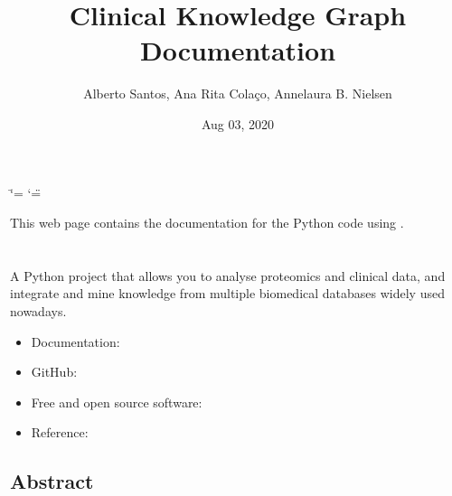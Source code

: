 \documentclass[letterpaper,10pt,english]{sphinxmanual}
\title{Clinical Knowledge Graph Documentation}
\date{Aug 03, 2020}
\author{Alberto Santos, Ana Rita Colaço, Annelaura B. Nielsen}
\begin{document}
\ifdefined\shorthandoff
  \ifnum\catcode`\=\string=\active\shorthandoff{=}\fi
  \ifnum\catcode`\"=\active{}\fi
\fi

\pagestyle{empty}
\sphinxmaketitle
\pagestyle{plain}
\sphinxtableofcontents
\pagestyle{normal}
\label{\detokenize{index::doc}}


This web page contains the documentation for the Python code using .




\chapter{}
\label{\detokenize{INTRO:clinical-knowledge-graph}}\label{\detokenize{INTRO::doc}}
 

A Python project that allows you to analyse proteomics and clinical data, and integrate and mine knowledge from multiple biomedical databases widely used nowadays.
\begin{itemize}
\item {} 
Documentation: 

\item {} 
GitHub: 

\item {} 
Free and open source software: 

\item {} 
Reference: 

\end{itemize}


\section{Abstract}
\label{\detokenize{INTRO:abstract}}
\end{document}
